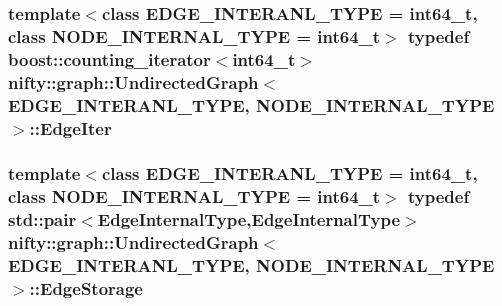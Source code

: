 \subsubsection[{Edge\+Iter}]{\setlength{\rightskip}{0pt plus 5cm}template$<$class E\+D\+G\+E\+\_\+\+I\+N\+T\+E\+R\+A\+N\+L\+\_\+\+T\+Y\+P\+E = int64\+\_\+t, class N\+O\+D\+E\+\_\+\+I\+N\+T\+E\+R\+N\+A\+L\+\_\+\+T\+Y\+P\+E = int64\+\_\+t$>$ typedef boost\+::counting\+\_\+iterator$<$int64\+\_\+t$>$ {\bf nifty\+::graph\+::\+Undirected\+Graph}$<$ E\+D\+G\+E\+\_\+\+I\+N\+T\+E\+R\+A\+N\+L\+\_\+\+T\+Y\+P\+E, N\+O\+D\+E\+\_\+\+I\+N\+T\+E\+R\+N\+A\+L\+\_\+\+T\+Y\+P\+E $>$\+::{\bf Edge\+Iter}}\label{classnifty_1_1graph_1_1UndirectedGraph_aa37a0dc690ad1257d5eb5105e7d66bba}
\hypertarget{classnifty_1_1graph_1_1UndirectedGraph_a77256cc943f931180bf84b14d943f39a}{}
\subsubsection[{Edge\+Storage}]{\setlength{\rightskip}{0pt plus 5cm}template$<$class E\+D\+G\+E\+\_\+\+I\+N\+T\+E\+R\+A\+N\+L\+\_\+\+T\+Y\+P\+E = int64\+\_\+t, class N\+O\+D\+E\+\_\+\+I\+N\+T\+E\+R\+N\+A\+L\+\_\+\+T\+Y\+P\+E = int64\+\_\+t$>$ typedef std\+::pair$<${\bf Edge\+Internal\+Type},{\bf Edge\+Internal\+Type}$>$ {\bf nifty\+::graph\+::\+Undirected\+Graph}$<$ E\+D\+G\+E\+\_\+\+I\+N\+T\+E\+R\+A\+N\+L\+\_\+\+T\+Y\+P\+E, N\+O\+D\+E\+\_\+\+I\+N\+T\+E\+R\+N\+A\+L\+\_\+\+T\+Y\+P\+E $>$\+::{\bf Edge\+Storage}\hspace{0.3cm}{\ttfamily [protected]}}\label{classnifty_1_1graph_1_1UndirectedGraph_a77256cc943f931180bf84b14d943f39a}
\hypertarget{classnifty_1_1graph_1_1UndirectedGraph_ab50d4774bd9a93ac226589352866df69}{}
